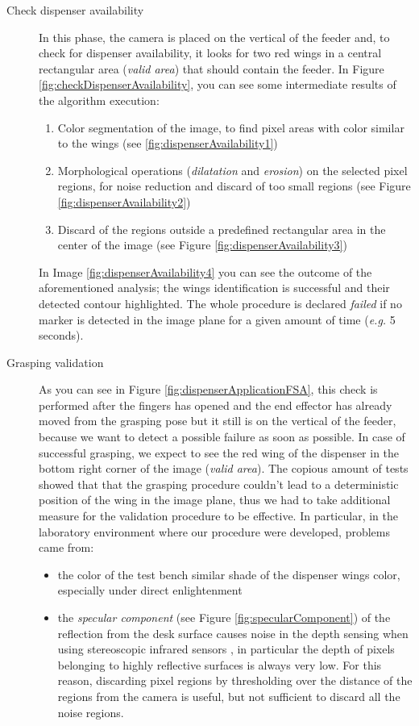 \begin{description}
	\item [Check dispenser availability] In this phase, the camera is placed on the vertical of the feeder and, to check for dispenser availability, it looks for two red wings in a central rectangular area (\textit{valid area}) that should contain the feeder. In Figure \ref{fig:checkDispenserAvailability}, you can see some intermediate results of the algorithm execution:
		\begin{enumerate}
			\item Color segmentation of the image, to find pixel areas with color similar to the wings (see \ref{fig:dispenserAvailability1})
			\item Morphological operations (\textit{dilatation} and \textit{erosion}) on the selected pixel regions, for noise reduction and discard of too small regions (see Figure \ref{fig:dispenserAvailability2})
			\item Discard of the regions outside a predefined rectangular area in the center of the image (see Figure \ref{fig:dispenserAvailability3})
		\end{enumerate}
	In Image \ref{fig:dispenserAvailability4} you can see the outcome of the aforementioned analysis; the wings identification is successful and their detected contour highlighted. The whole procedure is declared \textit{failed} if no marker is detected in the image plane for a given amount of time (\textit{e.g.} 5 seconds).
	
	\item[Grasping validation] As you can see in Figure \ref{fig:dispenserApplicationFSA}, this check is performed after the fingers has opened and the end effector has already moved from the grasping pose but it still is on the vertical of the feeder, because we want to detect a possible failure as soon as possible. In case of successful grasping, we expect to see the red wing of the dispenser in the bottom right corner of the image (\textit{valid area}). The copious amount of tests showed that that the grasping procedure couldn't lead to a deterministic position of the wing in the image plane, thus we had to take additional measure for the validation procedure to be effective. In particular, in the laboratory environment where our procedure were developed, problems came from:
	
	\begin{itemize}
		\item the color of the test bench similar shade of the dispenser wings color, especially under direct enlightenment
		\item the \textit{specular component} (see Figure \ref{fig:specularComponent}) of the reflection from the desk surface causes noise in the depth sensing when using stereoscopic infrared sensors \parencite{reflectionDepthSensing}, in particular the depth of pixels belonging to highly reflective surfaces is always very low. For this reason, discarding pixel regions by thresholding over the distance of the regions from the camera is useful, but not sufficient to discard all the noise regions.
	\end{itemize}



\end{description}
